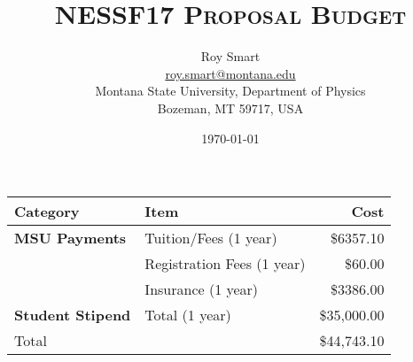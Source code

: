 \documentclass{article}
\title{\textsc{NESSF17 Proposal Budget}}
\date{\today}
\author{Roy Smart \\ \url{roy.smart@montana.edu} \\ Montana State University, Department of Physics \\ Bozeman, MT 59717, USA}
\begin{document}
	
	\maketitle

	
	\begin{tabular}{|l | l | r|}
		\hline 
		Category & Item & Cost\\ \hline
		\textbf{MSU Payments} & Tuition/Fees (1 year) & \$6357.10 \\ \hline
		& Registration Fees (1 year) & \$60.00 \\ \hline
		& Insurance (1 year) & \$3386.00 \\ \hline
		\textbf{Student Stipend} & Total (1 year) & \$35,000.00 \\ \hline
		Total & & \$44,743.10 \\ \hline
	\end{tabular}
	
\end{document}
